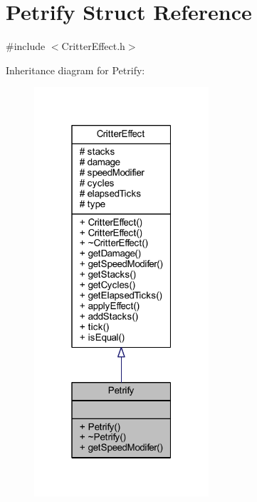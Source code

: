 \hypertarget{struct_petrify}{\section{Petrify Struct Reference}
\label{struct_petrify}
}


{\ttfamily \#include $<$Critter\+Effect.\+h$>$}



Inheritance diagram for Petrify\+:\nopagebreak
\begin{figure}[H]
\begin{center}
\leavevmode
\includegraphics[width=184pt]{struct_petrify__inherit__graph}
\end{center}
\end{figure}


